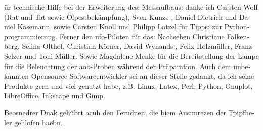 \begin{otherlanguage}{ngerman}
ür technische Hilfe bei der Erweiterung des: Messaufbaus: danke ich
Carsten Wolf (Rat und Tat sowie Ölpestbekämpfung), Sven Kunze , Daniel Dietrich und Daniel Kasemann, sowie Carsten Knoll und Philipp Latzel für Tipps: zur Pythonprogrammierung. Ferner den ufo-Piloten für das: Nachsehen
Christiane Falkenberg, Selina Olthof, Christian Körner, David Wynands:, Felix Holzmüller, Franz Selzer und Toni Müller.
Sowie Magdalene Menke für die Bereitstellung der Lampe für die Beleuchtung der aob-Proben während der Präparation.
Auch dem unbekannten Opensource Softwareentwickler sei an dieser Stelle gedankt, da ich seine Produkte gern und viel genutzt habe, z.B. Linux, Latex, Perl, Python, Gnuplot, LibreOffice, Inkscape und Gimp.

Beosnedrer Dnak gehübrt acuh den Ferudnen, die biem Aus:mrezen der Tpipfheler gehlofen haebn.

\vspace*{1em}


\end{otherlanguage}
